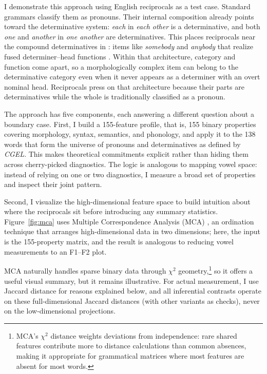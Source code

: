 \documentclass[12pt]{article}
\providecommand{\mention}[1]{\textit{#1}}
\begin{document}
I demonstrate this approach using English reciprocals as a test case. Standard grammars classify them as pronouns. Their internal composition already points toward the determinative system: \mention{each} in \mention{each other} is a determinative, and both \mention{one} and \mention{another} in \mention{one another} are determinatives. This places reciprocals near the compound determinatives in \textcite[henceforth \textit{CGEL}; Ch. 5 \S9.6]{huddleston2002}: items like \mention{somebody} and \mention{anybody} that realize fused determiner--head functions \parencite{Payne2007}. Within that architecture, category and function come apart, so a morphologically complex item can belong to the determinative category even when it never appears as a determiner with an overt nominal head. Reciprocals press on that architecture because their parts are determinatives while the whole is traditionally classified as a pronoun.

The approach has five components, each answering a different question about a boundary case. First, I build a 155-feature profile, that is, 155 binary properties covering morphology, syntax, semantics, and phonology, and apply it to the 138 words that form the universe of pronouns and determinatives as defined by \textit{CGEL}. This makes theoretical commitments explicit rather than hiding them across cherry-picked diagnostics. The logic is analogous to mapping vowel space: instead of relying on one or two diagnostics, I measure a broad set of properties and inspect their joint pattern.

Second, I visualize the high-dimensional feature space to build intuition about where the reciprocals sit before introducing any summary statistics. Figure~\ref{fig:mca} uses Multiple Correspondence Analysis (MCA) \parencite{greenacre2017correspondence}, an ordination technique that arranges high-dimensional data in two dimensions; here, the input is the 155-property matrix, and the result is analogous to reducing vowel measurements to an F1--F2 plot.

MCA naturally handles sparse binary data through $\chi^2$ geometry,\footnote{MCA's $\chi^2$ distance weights deviations from independence: rare shared features contribute more to distance calculations than common absences, making it appropriate for grammatical matrices where most features are absent for most words.} so it offers a useful visual summary, but it remains illustrative. For actual measurement, I use Jaccard distance for reasons explained below, and all inferential contrasts operate on these full-dimensional Jaccard distances (with other variants as checks), never on the low-dimensional projections.
\end{document}
